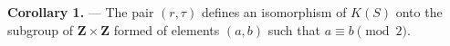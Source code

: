 \textbf{Corollary 1.} — The pair $(r, \tau)$ defines an isomorphism of $K(S)$ onto the subgroup of $\mathbf{Z} \times \mathbf{Z}$ formed of elements $(a, b)$ such that $a \equiv b \pmod{2}$.
